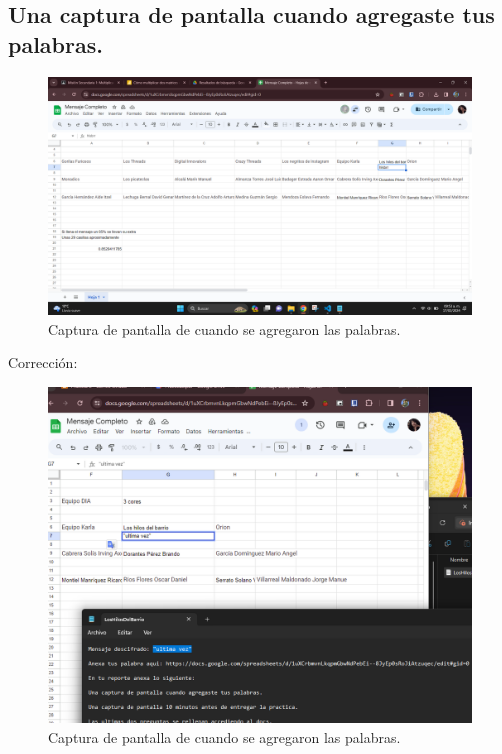 \documentclass{article}
\begin{document}
\subsection{Una captura de pantalla cuando agregaste tus palabras.}

\begin{figure}[h!]
    \centering
    \includegraphics[width=\textwidth]{errorPalabra.png}
    \caption{Captura de pantalla de cuando se agregaron las palabras.}
    \label{fig:captura-pantalla}
\end{figure}

Corrección:
\begin{figure}[h!]
    \centering
    \includegraphics[width=\textwidth]{agreguePalabras.png}
    \caption{Captura de pantalla de cuando se agregaron las palabras.}
    \label{fig:captura-pantalla}
\end{figure}
\end{document}
